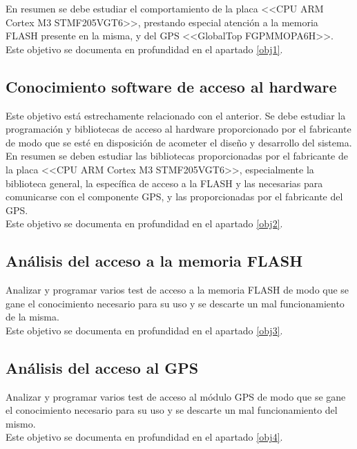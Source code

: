 En resumen se debe estudiar el comportamiento de la placa <<CPU ARM Cortex M3 STMF205VGT6>>, prestando especial atención a la memoria FLASH presente en la misma, y del GPS <<GlobalTop FGPMMOPA6H>>.\\   

Este objetivo se documenta en profundidad en el apartado \ref{obj1}.        

\subsection{Conocimiento software de acceso al hardware}
Este objetivo está estrechamente relacionado con el anterior. Se debe estudiar la programación y bibliotecas de acceso al hardware proporcionado por el fabricante de modo que se esté en disposición de acometer el diseño y desarrollo del sistema.\\

En resumen se deben estudiar las bibliotecas proporcionadas por el fabricante de la placa <<CPU ARM Cortex M3 STMF205VGT6>>, especialmente la biblioteca general, la específica de acceso a la FLASH y las necesarias para comunicarse con el componente GPS, y las proporcionadas por el fabricante del GPS.\\

Este objetivo se documenta en profundidad en el apartado \ref{obj2}.        

 
\subsection{Análisis del acceso a la memoria FLASH}
 Analizar y programar varios test de acceso a la memoria FLASH de modo que se gane el conocimiento necesario para su uso y se descarte un mal funcionamiento de la misma.\\
 
 Este objetivo se documenta en profundidad en el apartado \ref{obj3}.        

\subsection{Análisis del acceso al GPS}
Analizar y programar varios test de acceso al módulo GPS de modo que se gane el conocimiento necesario para su uso y se descarte un mal funcionamiento del mismo.\\

Este objetivo se documenta en profundidad en el apartado \ref{obj4}.        


